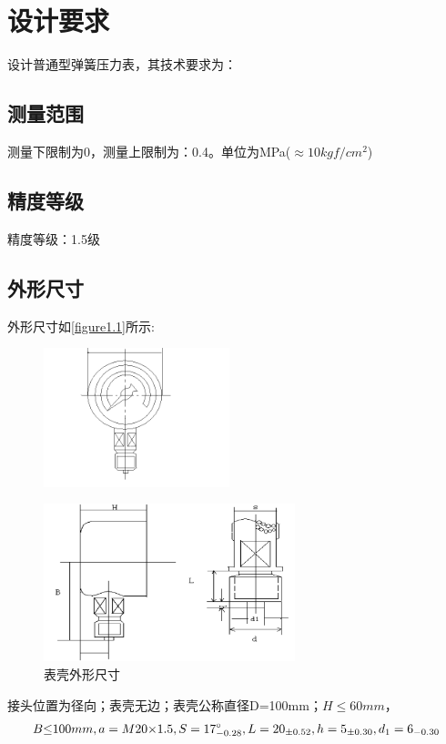 \section{设计要求}
设计普通型弹簧压力表，其技术要求为：
\subsection{测量范围}
测量下限制为0，测量上限制为：0.4。单位为MPa(${\approx}10kgf/cm^2$)
\subsection{精度等级}
精度等级：1.5级
\subsection{外形尺寸}
外形尺寸如\autoref{figure1.1}所示:
\begin{figure}[!htbp]
    \centering
    \includegraphics[width =0.48\textwidth]{figures/1.1.1.png}
    \caption*{}
\end{figure}
\begin{figure}[!htbp]
    \centering
    \includegraphics[width =0.65\textwidth]{figures/1.1.2.png}
    \caption{表壳外形尺寸}
    \label{figure1.1}
\end{figure}
\newline
接头位置为径向；表壳无边；表壳公称直径D=100mm；$H{\le}60mm$，
\begin{equation}
{B{\le}100mm,a=M20{\times}1.5,S=17_{-0.28}^{\circ},\\L=20_{{\pm}0.52},h=5_{{\pm}0.30},d_{1}=6_{-0.30}}\nonumber
\end{equation}
